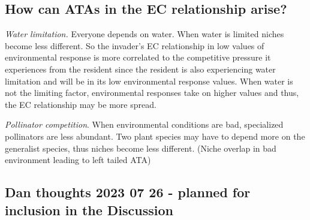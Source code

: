 \documentclass[letterpaper,11pt]{article}
\begin{document}
\subsection{How can ATAs in the EC relationship arise?}
\emph{Water limitation.} Everyone depends on water. When water is limited niches become less different. So the invader's EC relationship in low values of environmental response is more correlated to the competitive pressure it experiences from the resident since the resident is also experiencing water limitation and will be in its low environmental response values. When water is not the limiting factor, environmental responses take on higher values and thus, the EC relationship may be more spread. 

\emph{Pollinator competition}. When environmental conditions are bad, specialized pollinators are less abundant. Two plant species may have to depend more on the generalist species, thus niches become less different.  (Niche overlap in bad environment leading to left tailed ATA)

\subsection{Dan thoughts 2023 07 26 - planned for inclusion in the Discussion}
\end{document}
